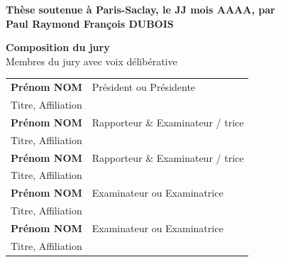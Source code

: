 \begin{titlepage}
	\textbf{Thèse soutenue à Paris-Saclay, le JJ mois AAAA, par}\\
	\bigskip
	\Large {\color{Prune} \textbf{Paul Raymond François DUBOIS}} %
	
	\vspace{\fill} %
	
	\bigskip
	
	\flushleft
	\small {\color{Prune} \textbf{Composition du jury}}\\
	{\color{Prune} \scriptsize {Membres du jury avec voix délibérative}} \\
	\vspace{2mm}
	\scriptsize
	\begin{tabular}{|p{7cm}l}
		\arrayrulecolor{Prune}
		\textbf{Prénom NOM} &   Président ou Présidente\\ 
		Titre, Affiliation & \\
		\textbf{Prénom NOM} &  Rapporteur \& Examinateur / trice \\ 
		Titre, Affiliation   &   \\ 
		\textbf{Prénom NOM} &  Rapporteur \& Examinateur / trice \\ 
		Titre, Affiliation  &   \\ 
		\textbf{Prénom NOM} &  Examinateur ou Examinatrice \\ 
		Titre, Affiliation   &   \\ 
		\textbf{Prénom NOM} &  Examinateur ou Examinatrice \\ 
		Titre, Affiliation   &   \\ 
		
		
	\end{tabular} 
	
\end{titlepage}